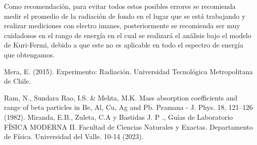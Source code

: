 \documentclass[10pt,twocolumns,letterpaper]{article}
\begin{document}
Como recomendación, para evitar todos estos posibles errores se recomienda medir el promedio de la radiación de fondo en el lugar que se está trabajando y realizar mediciones con electro imanes, posteriormente se recomienda ser muy cuidadosos en el rango de energía en el cual se realizará el análisis bajo el modelo de Kuri-Fermi, debido a que este no es aplicable en todo el espectro de energía que obtengamos.
\begin{thebibliography}{99}
 Mera, E. (2015). Experimento: Radiación. Universidad Tecnológica Metropolitana de Chile.

 Ram, N., Sundara Rao, I.S. \& Mehta, M.K. Mass absorption coefficients and range of beta particles in Be, Al, Cu, Ag and Pb. Pramana - J. Phys. 18, 121–126 (1982). 
 Miranda, E.B., Zuleta, C.A y Bastidas J. P ., Guías de Laboratorio FÍSICA MODERNA II. Facultad de Ciencias Naturales y Exactas. Departamento de Física. Universidad del Valle. 10-14 (2023).
\end{thebibliography} 
\end{document}
